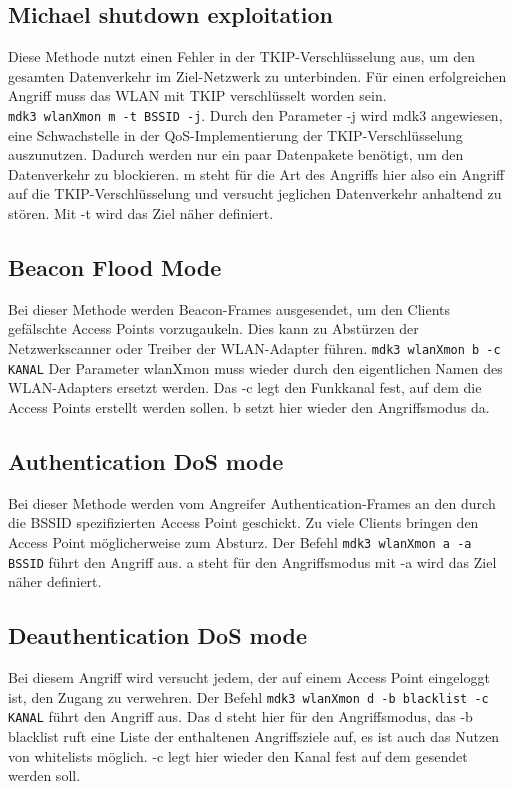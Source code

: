 \subsection{Michael shutdown exploitation}
Diese Methode nutzt einen Fehler in der TKIP-Verschlüsselung aus, um den gesamten Datenverkehr im Ziel-Netzwerk zu unterbinden. Für einen erfolgreichen Angriff muss das WLAN mit TKIP verschlüsselt worden sein.\\
\colorbox{altgray}{\lstinline|mdk3 wlanXmon m -t BSSID -j|}. Durch den Parameter -j wird mdk3 angewiesen, eine Schwachstelle in der QoS-Implementierung der TKIP-Verschlüsselung auszunutzen. Dadurch werden nur ein paar Datenpakete benötigt, um den Datenverkehr zu blockieren. m steht für die Art des Angriffs hier also ein Angriff auf die TKIP-Verschlüsselung und versucht jeglichen Datenverkehr anhaltend zu stören. Mit -t wird das Ziel näher definiert.

\subsection{Beacon Flood Mode}
Bei dieser Methode werden Beacon-Frames ausgesendet, um den Clients gefälschte Access Points vorzugaukeln. Dies kann zu Abstürzen der Netzwerkscanner oder Treiber der WLAN-Adapter führen.
\colorbox{altgray}{\lstinline|mdk3 wlanXmon b -c KANAL|}
Der Parameter wlanXmon muss wieder durch den eigentlichen Namen des WLAN-Adapters ersetzt werden.
Das -c legt den Funkkanal fest, auf dem die Access Points erstellt werden sollen. b setzt hier wieder den Angriffsmodus da.

\subsection{Authentication DoS mode}
Bei dieser Methode werden vom Angreifer Authentication-Frames an den durch die BSSID spezifizierten Access Point geschickt. Zu viele Clients bringen den Access Point möglicherweise zum Absturz. Der Befehl
\colorbox{altgray}{\lstinline|mdk3 wlanXmon a -a BSSID|} führt den Angriff aus. a steht für den Angriffsmodus mit -a wird das Ziel näher definiert.

\subsection{Deauthentication DoS mode}
Bei diesem Angriff wird versucht jedem, der auf einem Access Point eingeloggt ist, den Zugang zu verwehren. Der Befehl \colorbox{altgray}{\lstinline|mdk3 wlanXmon d -b blacklist -c KANAL|} führt den Angriff aus. Das d steht hier für den Angriffsmodus, das -b blacklist ruft eine Liste der enthaltenen Angriffsziele auf, es ist auch das Nutzen von whitelists möglich. -c legt hier wieder den Kanal fest auf dem gesendet werden soll.

